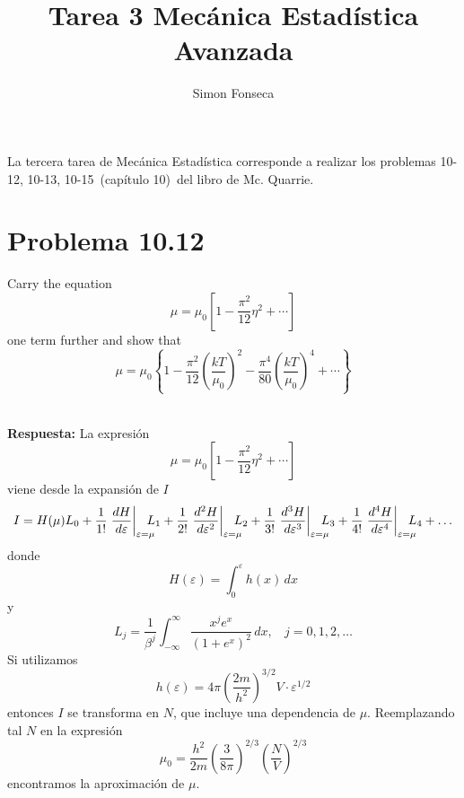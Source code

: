 \documentclass[]{article}
\title{Tarea 3 Mecánica Estadística Avanzada}
\author{Simon Fonseca}
\numberwithin{equation}{section}
\newcommand{\0}{\textcolor{gray}{0}}
\newcommand{\td}[2]{\dfrac{d #1}{d #2}}
\newcommand{\resp}{
	\\
	
	\textbf{Respuesta:} }
\begin{document}
\maketitle

La tercera tarea de Mecánica Estadística corresponde a realizar los problemas 10-12, 10-13, 10-15 (capítulo 10) del libro de Mc. Quarrie.

\section{Problema 10.12}
Carry the equation
\begin{equation}
	\mu = \mu_0\left[1 - \frac{\pi^2}{12} \eta^2 + \cdots\right]
\end{equation}
one term further and show that
\begin{equation}
	\mu = \mu_0\left\{1 - \frac{\pi^2}{12} \left(\frac{kT}{\mu_0}\right)^2 - \frac{\pi^4}{80} \left(\frac{kT}{\mu_0}\right)^4 + \cdots \right\}
\end{equation}
\resp La expresión
\begin{equation*}
	\mu = \mu_0\left[1 - \frac{\pi^2}{12} \eta^2 + \cdots\right]
\end{equation*}
viene desde la expansión de $I$
\begin{equation}
	I = H(\mu) L_0 + \frac{1}{1!}\left. \td{H}{\varepsilon}\right|_{\varepsilon=\mu} \hspace{-3mm} L_1 + \frac{1}{2!}\left. \td{^2 H}{\varepsilon^2}\right|_{\varepsilon=\mu} \hspace{-3mm} L_2 + \frac{1}{3!}\left. \td{^3 H}{\varepsilon^3}\right|_{\varepsilon=\mu} \hspace{-3mm} L_3 + \frac{1}{4!}\left. \td{^4 H}{\varepsilon^4}\right|_{\varepsilon=\mu} \hspace{-3mm} L_4 + \ldots
\end{equation}
donde
\begin{equation}
	H(\varepsilon) = \int_{0}^{\varepsilon} h(x) \, dx
\end{equation}
y
\begin{equation}
	L_j = \frac{1}{\beta^j} \int_{-\infty}^{\infty} \frac{x^j e^x}{\left(1 + e^x\right)^2} \, dx, ~~~~ j = 0,1,2,\ldots
\end{equation}
Si utilizamos 
\begin{equation}
	h(\varepsilon)= 4 \pi\left(\frac{2 m}{h^2}\right)^{3 / 2} V \cdot \varepsilon^{1 / 2}
\end{equation}
entonces $I$ se transforma en $N$, que incluye una dependencia de $\mu$. Reemplazando tal $N$ en la expresión
\begin{equation*}
	\mu_0 = \frac{h^2}{2 m}\left(\frac{3}{8 \pi}\right)^{2 / 3}\left(\frac{N}{V}\right)^{2 / 3}
\end{equation*}
encontramos la aproximación de $\mu$.
\end{document}
